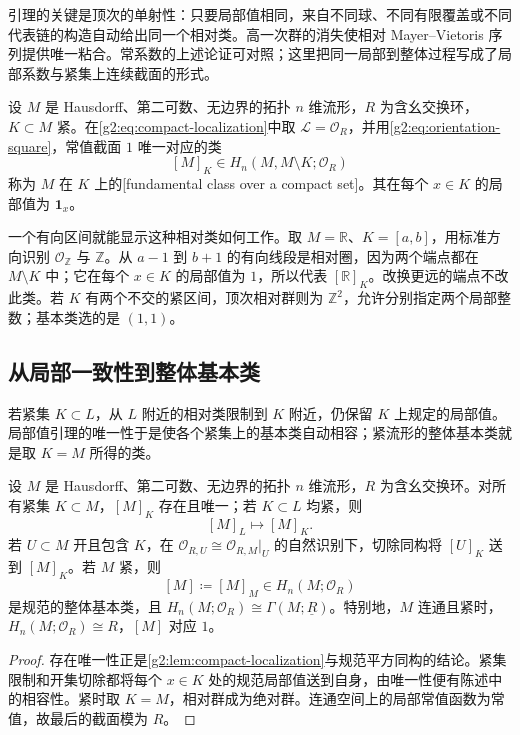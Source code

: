 引理的关键是顶次的单射性：只要局部值相同，来自不同球、不同有限覆盖或不同代表链的构造自动给出同一个相对类。高一次群的消失使相对 Mayer--Vietoris 序列提供唯一粘合。常系数的上述论证可对照\cite[第3.3节，Orientations and Homology]{Hatcher2002}；这里把同一局部到整体过程写成了局部系数与紧集上连续截面的形式。

\begin{definition}[紧集上的基本类]\label{g2:def:compact-fundamental-class}
	设 \(M\) 是 Hausdorff、第二可数、无边界的拓扑 \(n\) 维流形，\(R\) 为含幺交换环，\(K\subset M\) 紧。在\eqref{g2:eq:compact-localization}中取 \(\mathcal L=\mathcal O_R\)，并用\eqref{g2:eq:orientation-square}，常值截面 \(1\) 唯一对应的类
	\[
		[M]_K\in H_n(M,M\setminus K;\mathcal O_R)
	\]
	称为 \(M\) 在 \(K\) 上的[fundamental class over a compact set]。其在每个 \(x\in K\) 的局部值为 \(\mathbf1_x\)。
\end{definition}

一个有向区间就能显示这种相对类如何工作。取 \(M=\mathbb R\)、\(K=[a,b]\)，用标准方向识别 \(\mathcal O_{\mathbb Z}\) 与 \(\mathbb Z\)。从 \(a-1\) 到 \(b+1\) 的有向线段是相对圈，因为两个端点都在 \(M\setminus K\) 中；它在每个 \(x\in K\) 的局部值为 \(1\)，所以代表 \([\mathbb R]_K\)。改换更远的端点不改此类。若 \(K\) 有两个不交的紧区间，顶次相对群则为 \(\mathbb Z^2\)，允许分别指定两个局部整数；基本类选的是 \((1,1)\)。

\subsection{从局部一致性到整体基本类}
\label{g2:subsec:0601:03}
若紧集 \(K\subset L\)，从 \(L\) 附近的相对类限制到 \(K\) 附近，仍保留 \(K\) 上规定的局部值。局部值引理的唯一性于是使各个紧集上的基本类自动相容；紧流形的整体基本类就是取 \(K=M\) 所得的类。

\begin{theorem}\label{g2:thm:fundamental-class}
	设 \(M\) 是 Hausdorff、第二可数、无边界的拓扑 \(n\) 维流形，\(R\) 为含幺交换环。对所有紧集 \(K\subset M\)，\([M]_K\) 存在且唯一；若 \(K\subset L\) 均紧，则
	\begin{equation}\label{g2:eq:fundamental-class-restriction}
		[M]_L\longmapsto[M]_K.
	\end{equation}
	若 \(U\subset M\) 开且包含 \(K\)，在 \(\mathcal O_{R,U}\cong\mathcal O_{R,M}|_U\) 的自然识别下，切除同构将 \([U]_K\) 送到 \([M]_K\)。若 \(M\) 紧，则
	\[
		[M]\coloneqq[M]_M\in H_n(M;\mathcal O_R)
	\]
	是规范的整体基本类，且 \(H_n(M;\mathcal O_R)\cong\Gamma(M;\underline R)\)。特别地，\(M\) 连通且紧时，\(H_n(M;\mathcal O_R)\cong R\)，\([M]\) 对应 \(1\)。
\end{theorem}
\begin{proof}
	存在唯一性正是\cref{g2:lem:compact-localization}与规范平方同构的结论。紧集限制和开集切除都将每个 \(x\in K\) 处的规范局部值送到自身，由唯一性便有陈述中的相容性。紧时取 \(K=M\)，相对群成为绝对群。连通空间上的局部常值函数为常值，故最后的截面模为 \(R\)。
\end{proof}

